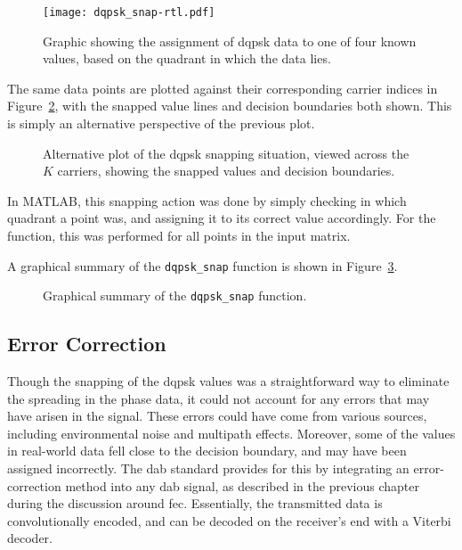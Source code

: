 \documentclass[class=report,11pt,crop=false]{standalone}
\begin{document}
\begin{figure}[htbp]
  \centering
  \captionsetup{type=figure}
  \texttt{[image: dqpsk\_snap-rtl.pdf]}
  \caption{Graphic showing the assignment of \gls{dqpsk} data to one of four known values, based on the quadrant in which the data lies.}
  \label{fig:dqpsk_snap_rtl}
\end{figure}

The same data points are plotted against their corresponding carrier indices in Figure~\ref{fig:dqpsk_snap_rtl-alt}, with the snapped value lines and decision boundaries both shown. This is simply an alternative perspective of the previous plot.

\begin{figure}[htbp]
  \centering
  \captionsetup{type=figure}
  \def\svgwidth{\linewidth}
  { %
      }
  \caption{Alternative plot of the \gls{dqpsk} snapping situation, viewed across the \(K\) carriers, showing the snapped values and decision boundaries.}
  \label{fig:dqpsk_snap_rtl-alt}
\end{figure}

In MATLAB, this snapping action was done by simply checking in which quadrant a point was, and assigning it to its correct value accordingly. For the function, this was performed for all points in the input matrix.

A graphical summary of the \texttt{dqpsk\_snap} function is shown in Figure~\ref{fig:dqpsk_snap}.

\begin{figure}[htbp]
  \centering
  \captionsetup{type=figure}
  \def\svgwidth{\linewidth}
  { %
      }
      \caption{Graphical summary of the \texttt{dqpsk\_snap} function.}
  \label{fig:dqpsk_snap}
\end{figure}

\subsection{Error Correction \label{subsect:dab-proc_error-correct}}
Though the snapping of the \gls{dqpsk} values was a straightforward way to eliminate the spreading in the phase data, it could not account for any errors that may have arisen in the signal. These errors could have come from various sources, including environmental noise and multipath effects. Moreover, some of the values in real-world data fell close to the decision boundary, and may have been assigned incorrectly. The \gls{dab} standard provides for this by integrating an error-correction method into any \gls{dab} signal, as described in the previous chapter during the discussion around \gls{fec}. Essentially, the transmitted data is convolutionally encoded, and can be decoded on the receiver's end with a Viterbi decoder.
\end{document}
